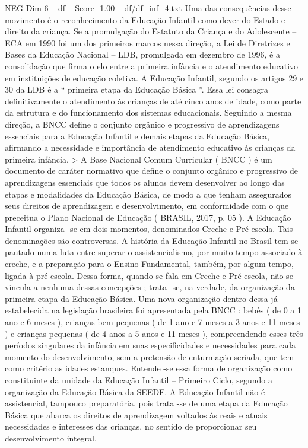 \begin{textsample}{NEG Dim 6 – df – Score -1.00 – df/df\_inf\_4.txt}
Uma das consequências desse movimento é o reconhecimento da Educação Infantil como dever do Estado e direito da criança.
Se a promulgação do Estatuto da Criança e do Adolescente – ECA em 1990 foi um dos primeiros marcos nessa direção, a Lei de Diretrizes e Bases da Educação Nacional – LDB, promulgada em dezembro de 1996, é a consolidação que firma o elo entre a primeira infância e o atendimento educativo em instituições de educação coletiva.
A Educação Infantil, segundo os artigos 29 e 30 da LDB é a “ primeira etapa da Educação Básica ”.
Essa lei consagra definitivamente o atendimento às crianças de até cinco anos de idade, como parte da estrutura e do funcionamento dos sistemas educacionais.
Seguindo a mesma direção, a BNCC define o conjunto orgânico e progressivo de aprendizagens essenciais para a Educação Infantil e demais etapas da Educação Básica, afirmando a necessidade e importância de atendimento educativo às crianças da primeira infância. > A Base Nacional Comum Curricular ( BNCC ) é um documento de caráter normativo que define o conjunto orgânico e progressivo de aprendizagens essenciais que todos os alunos devem desenvolver ao longo das etapas e modalidades da Educação Básica, de modo a que tenham assegurados seus direitos de aprendizagem e desenvolvimento, em conformidade com o que preceitua o Plano Nacional de Educação ( BRASIL, 2017, p. 05 ).
A Educação Infantil organiza -se em dois momentos, denominados Creche e Pré-escola.
Tais denominações são controversas.
A história da Educação Infantil no Brasil tem se pautado numa luta entre superar o assistencialismo, por muito tempo associado à creche, e a preparação para o Ensino Fundamental, também, por algum tempo, ligada à pré-escola.
Dessa forma, quando se fala em Creche e Pré-escola, não se vincula a nenhuma dessas concepções ; trata -se, na verdade, da organização da primeira etapa da Educação Básica.
Uma nova organização dentro dessa já estabelecida na legislação brasileira foi apresentada pela BNCC : bebês ( de 0 a 1 ano e 6 meses ), crianças bem pequenas ( de 1 ano e 7 meses a 3 anos e 11 meses ) e crianças pequenas ( de 4 anos a 5 anos e 11 meses ), compreendendo esses três períodos singulares da infância em suas especificidades e necessidades para cada momento do desenvolvimento, sem a pretensão de enturmação seriada, que tem como critério as idades estanques.
Entende -se essa forma de organização como constituinte da unidade da Educação Infantil – Primeiro Ciclo, segundo a organização da Educação Básica da SEEDF.
A Educação Infantil não é assistencial, tampouco preparatória, pois trata -se de uma etapa da Educação Básica que abarca os direitos de aprendizagem voltados às reais e atuais necessidades e interesses das crianças, no sentido de proporcionar seu desenvolvimento integral.

\end{textsample}
